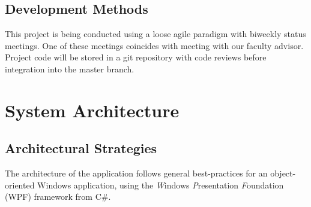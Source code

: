 \documentclass[12pt, letterpaper]{article}
\begin{document}
  \subsection{Development Methods}
    This project is being conducted using a loose agile paradigm with biweekly status meetings.
    One of these meetings coincides with meeting with our faculty advisor.
    Project code will be stored in a git repository with code reviews before integration into the master branch.

\newpage
\section{System Architecture}
\subsection{Architectural Strategies}
The architecture of the application follows general best-practices for an object-oriented Windows application,
  using the \emph{W}indows \emph{P}resentation \emph{F}oundation (WPF) framework from C\#.
\end{document}
